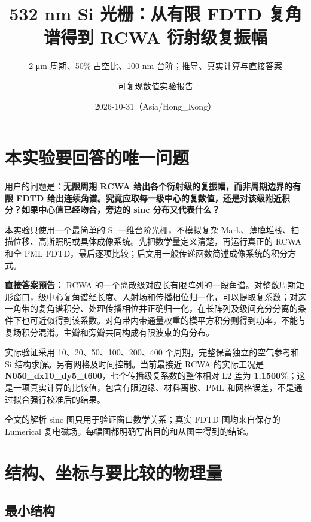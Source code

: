 \documentclass[
  chinese,
  UTF8,
  a4paper,
  11pt]{ctexart}
\title{532 nm Si 光栅：从有限 FDTD 复角谱得到 RCWA 衍射级复振幅}
\subtitle{2 μm 周期、50\% 占空比、100 nm 台阶；推导、真实计算与直接答案}
\author{可复现数值实验报告}
\date{2026-10-31（Asia/Hong\_Kong）}
\begin{document}
\maketitle

{
\setcounter{tocdepth}{2}
\tableofcontents
}
\section{本实验要回答的唯一问题}\label{ux672cux5b9eux9a8cux8981ux56deux7b54ux7684ux552fux4e00ux95eeux9898}

用户的问题是：\textbf{无限周期 RCWA
给出各个衍射级的复振幅，而非周期边界的有限 FDTD
给出连续角谱。究竟应取每一级中心的复数值，还是对该级附近积分？如果中心值已经吻合，旁边的
sinc 分布又代表什么？}

本实验只使用一个最简单的 Si 一维台阶光栅，不模拟复杂
Mark、薄膜堆栈、扫描位移、高斯照明或具体成像系统。先把数学量定义清楚，再运行真正的
RCWA 和全 PML
FDTD，最后逐项比较；后文用一般传递函数简述成像系统的积分方式。

\textbf{直接答案预告：} RCWA
的一个离散级对应长有限阵列的一段角谱。对整数周期矩形窗口，级中心复角谱经长度、入射场和传播相位归一化，可以提取复系数；对这一角带的复角谱积分、处理传播相位并正确归一化，在长阵列及级间充分分离的条件下也可近似得到该系数。对角带内带通量权重的模平方积分则得到功率，不能与复场积分混淆。主瓣和旁瓣共同构成有限波束的角分布。

实际验证采用 10、20、50、100、200、400 个周期，完整保留独立的空气参考和
Si 结构求解。另有网格及时间控制。当前最接近 RCWA 的实际工况是
\textbf{N050\_dx10\_dy5\_t600}，七个传播级复系数的整体相对 L2 差为
\textbf{1.1500\%}；这是一项真实计算的比较值，包含有限边缘、材料离散、PML
和网格误差，不是通过拟合强行校准后的结果。

全文的解析 sinc 图只用于验证窗口数学关系；真实 FDTD 图均来自保存的
Lumerical 复电磁场。每幅图都明确写出目的和从图中得到的结论。

\section{结构、坐标与要比较的物理量}\label{ux7ed3ux6784ux5750ux6807ux4e0eux8981ux6bd4ux8f83ux7684ux7269ux7406ux91cf}

\subsection{最小结构}\label{ux6700ux5c0fux7ed3ux6784}
\end{document}

